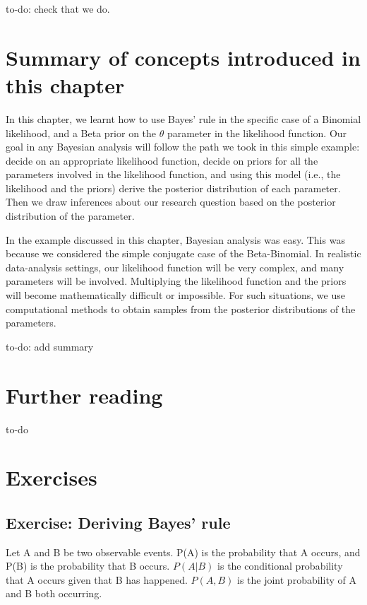 \documentclass[12pt,]{krantz}
\makeatletter
\newenvironment{kframe}{%
\medskip{}
\setlength{\fboxsep}{.8em}
 \def\at@end@of@kframe{}%
 \ifinner\ifhmode%
  \def\at@end@of@kframe{\end{minipage}}%
  \begin{minipage}{\columnwidth}%
 \fi\fi%
 \def\FrameCommand##1{\hskip\@totalleftmargin \hskip-\fboxsep
 \colorbox{shadecolor}{##1}\hskip-\fboxsep
     \hskip-\linewidth \hskip-\@totalleftmargin \hskip\columnwidth}%
 \MakeFramed {\advance\hsize-\width
   \@totalleftmargin\z@ \linewidth\hsize
   \@setminipage}}%
 {\par\unskip\endMakeFramed%
 \at@end@of@kframe}
\newenvironment{rmdblock}[1]
  {
  \begin{itemize}
  \renewcommand{\labelitemi}{
    \raisebox{-.7\height}[0pt][0pt]{
      {\setkeys{Gin}{width=3em,keepaspectratio}\texttt{[image: images/\#1]}}
    }
  }
  \setlength{\fboxsep}{1em}
  \begin{kframe}
  \item
  }
  {
  \end{kframe}
  \end{itemize}
  }
\newenvironment{rmdnote}
  {\begin{rmdblock}{note}}
  {\end{rmdblock}}
\theoremstyle{definition}
\theoremstyle{definition}
\theoremstyle{definition}
\theoremstyle{remark}
\makeatother
\begin{document}
\begin{rmdnote} to-do: check that we do.
\end{rmdnote}

\section{Summary of concepts introduced in this
chapter}\label{summary-of-concepts-introduced-in-this-chapter-1}

In this chapter, we learnt how to use Bayes' rule in the specific case
of a Binomial likelihood, and a Beta prior on the \(\theta\) parameter
in the likelihood function. Our goal in any Bayesian analysis will
follow the path we took in this simple example: decide on an appropriate
likelihood function, decide on priors for all the parameters involved in
the likelihood function, and using this model (i.e., the likelihood and
the priors) derive the posterior distribution of each parameter. Then we
draw inferences about our research question based on the posterior
distribution of the parameter.

In the example discussed in this chapter, Bayesian analysis was easy.
This was because we considered the simple conjugate case of the
Beta-Binomial. In realistic data-analysis settings, our likelihood
function will be very complex, and many parameters will be involved.
Multiplying the likelihood function and the priors will become
mathematically difficult or impossible. For such situations, we use
computational methods to obtain samples from the posterior distributions
of the parameters.
\begin{rmdnote} to-do: add summary \end{rmdnote}
\section{Further reading}\label{further-reading-1}

to-do

\section{Exercises}\label{exercises-1}

\subsection{Exercise: Deriving Bayes'
rule}\label{exercise-deriving-bayes-rule}

Let A and B be two observable events. P(A) is the probability that A
occurs, and P(B) is the probability that B occurs. \(P(A|B)\) is the
conditional probability that A occurs given that B has happened.
\(P(A,B)\) is the joint probability of A and B both occurring.
\end{document}
